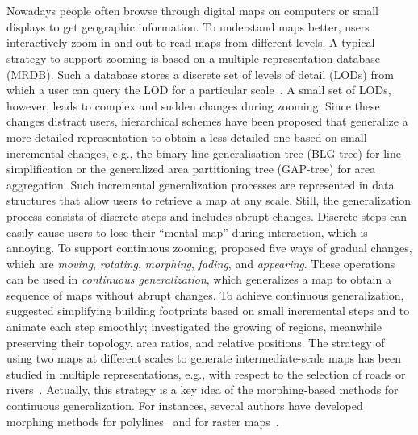 \chapter[\AdminBoundToCTitle]{\AdminBoundTitle} 


\label{chap:Admin}

\chaptermark{\AdminBoundChapterMark}

Nowadays people often browse through digital maps 
on computers or small displays to get geographic information. 
To understand maps better, 
users interactively zoom in and out to read maps 
from different levels. 
A typical strategy to support zooming is based on a
multiple representation database (MRDB).  
Such a database stores a discrete set of levels of detail (LODs) 
from which a user can query the LOD for a particular 
scale~\parencite{Hampe2004multiple}. 
A small set of LODs, however, leads to 
complex and sudden changes during zooming. 
%
Since these changes distract users, 
hierarchical schemes have been proposed
that generalize a more-detailed representation to obtain a
less-detailed one based on small incremental changes, 
e.g., the binary line generalisation tree (BLG-tree)
\parencite{vanOosterom2005} 
for line simplification or
the generalized area partitioning tree (GAP-tree)
\parencite{vanOosterom1995GAPTree}
for area aggregation.  
Such incremental generalization processes are represented 
in data structures 
that allow users to retrieve a map at any scale.  
Still, the generalization process consists of discrete steps 
and includes abrupt changes.  
Discrete steps can easily cause users to lose their
``mental map'' during interaction, which is annoying. 
To support continuous zooming, 
\textcite{vanKreveld2001} proposed five ways of gradual changes, 
which are \emph{moving}, \emph{rotating}, \emph{morphing}, 
\emph{fading}, and \emph{appearing}. 
These operations can be used 
in \emph{continuous generalization},
which generalizes a map to obtain a sequence of maps 
without abrupt changes.
To achieve continuous generalization, 
\textcite{Sester2004} suggested simplifying building
footprints based on small incremental steps and 
to animate each step smoothly;
\textcite{Danciger2009} investigated the growing of regions, 
meanwhile preserving their topology, area ratios, and
relative positions. 
The strategy of using two maps at different scales
to generate intermediate-scale maps has been studied in multiple
representations, e.g., with respect to the selection of roads or
rivers~\parencite{Girres2014}. 
Actually, this strategy is a key idea of the
morphing-based methods for continuous generalization. 
For instances, several authors have developed  
morphing methods for polylines~\parencite{Cecconi2003, 
Noellenburg2008, Peng2013LSA, Schneider2015,
Peng2012River,Deng2015}
and for raster 
maps~\parencite{Reilly2004,
	Pantazis2009b}.  %


